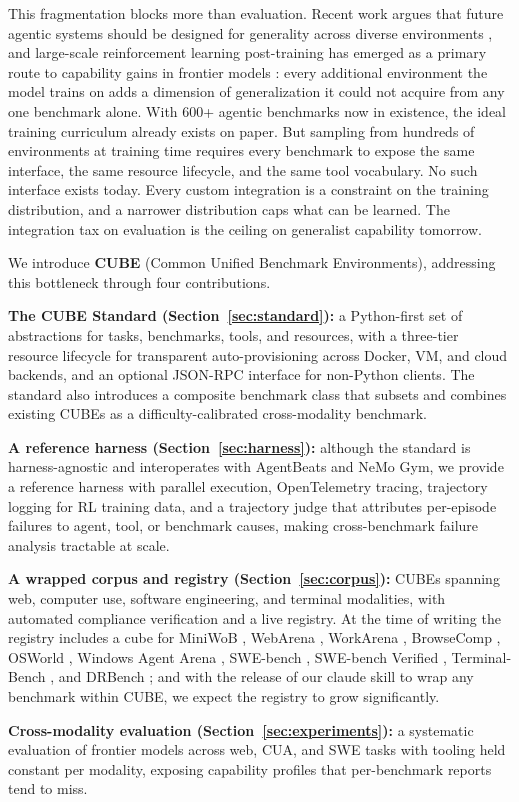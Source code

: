 \documentclass{article}
\newcommand{\NUMCUBES}{10}            %
\newcommand{\mypar}[1]{\par\noindent\textbf{#1}\enspace}
\begin{document}
This fragmentation blocks more than evaluation. Recent work argues that future agentic
systems should be designed for generality across diverse environments
\citep{bandel2026agentic}, and large-scale reinforcement learning post-training has emerged
as a primary route to capability gains in frontier models \citep{Khatri2025TheAO}: every
additional environment the model trains on adds a dimension of generalization it could not
acquire from any one benchmark alone.
With 600+ agentic benchmarks now in existence, the ideal training curriculum already exists
on paper. But sampling from hundreds of environments at training time requires every
benchmark to expose the same interface, the same resource lifecycle, and the same tool
vocabulary. No such interface exists today. Every custom integration is a constraint on
the training distribution, and a narrower distribution caps what can be learned.
The integration tax on evaluation is the ceiling on generalist capability tomorrow.

We introduce \textbf{CUBE} (Common Unified Benchmark Environments), addressing this bottleneck through four contributions.
\mypar{The CUBE Standard (Section~\ref{sec:standard}):} a Python-first set of abstractions for tasks, benchmarks, tools, and resources, with a three-tier resource lifecycle for transparent auto-provisioning across Docker, VM, and cloud backends, and an optional JSON-RPC interface for non-Python clients. The standard also introduces a composite benchmark class that subsets and combines existing CUBEs as a difficulty-calibrated cross-modality benchmark.
\mypar{A reference harness (Section~\ref{sec:harness}):} although the standard is harness-agnostic and interoperates with AgentBeats and NeMo Gym, we provide a reference harness with parallel execution, OpenTelemetry tracing, trajectory logging for RL training data, and a trajectory judge that attributes per-episode failures to agent, tool, or benchmark causes, making cross-benchmark failure analysis tractable at scale.
\mypar{A wrapped corpus and registry (Section~\ref{sec:corpus}):} \NUMCUBES{} CUBEs spanning web, computer use, software engineering, and terminal modalities, with automated compliance verification and a live registry. At the time of writing the registry includes a cube for MiniWoB \citep{Shi2017WorldOB}, WebArena \citep{zhou2024webarena}, WorkArena \citep{drouin2024workarena}, BrowseComp \citep{wei2025browsecomp}, OSWorld \citep{xie2024osworld}, Windows Agent Arena \citep{bonatti2025windows}, SWE-bench \citep{jimenez2023swebench}, SWE-bench Verified \citep{yang2024swebenchverified}, Terminal-Bench \citep{merrill2026terminalbenchbenchmarkingagentshard}, and DRBench \citep{abaskohi2025drbench}; and with the release of our claude skill to wrap any benchmark within CUBE, we expect the registry to grow significantly.
\mypar{Cross-modality evaluation (Section~\ref{sec:experiments}):} a systematic evaluation of frontier models across web, CUA, and SWE tasks with tooling held constant per modality, exposing capability profiles that per-benchmark reports tend to miss.
\end{document}
